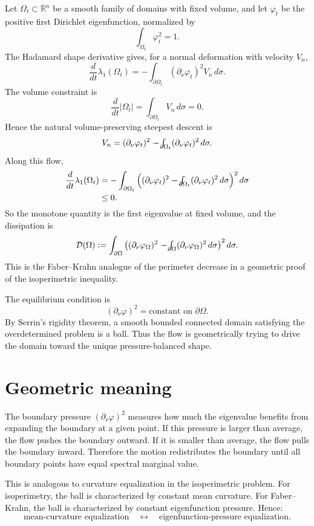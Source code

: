 \documentclass[11pt]{article}
\newcommand{\Om}{\Omega}
\newcommand{\R}{\mathbb{R}}
\newcommand{\D}{\mathcal D}
\newcommand{\fint}{\mathop{\mathchoice{\vcenter{\hbox{\Large$\int$}}\kern-1.4em\vcenter{\hbox{\scriptsize$-$}}}{\vcenter{\hbox{\large$\int$}}\kern-1.1em\vcenter{\hbox{\scriptsize$-$}}}{\vcenter{\hbox{$\int$}}\kern-.85em\vcenter{\hbox{\scriptsize$-$}}}{\vcenter{\hbox{$\int$}}\kern-.7em\vcenter{\hbox{\tiny$-$}}}}\nolimits}
\begin{document}
Let $\Om_t \subset \R^n$ be a smooth family of domains with fixed volume, and let $\varphi_t$ be the positive first Dirichlet eigenfunction, normalized by
\[
    \int_{\Om_t} \varphi_t^2 = 1.
\]
The Hadamard shape derivative gives, for a normal deformation with velocity $V_n$,
\[
    \frac{d}{dt}\lambda_1(\Om_t)
    = - \int_{\partial \Om_t} (\partial_\nu \varphi_t)^2 V_n \, d\sigma.
\]
The volume constraint is
\[
    \frac{d}{dt}|\Om_t| = \int_{\partial \Om_t} V_n \, d\sigma = 0.
\]
Hence the natural volume-preserving steepest descent is
\[
    V_n
    = (\partial_\nu \varphi_t)^2
    - \fint_{\partial \Om_t} (\partial_\nu \varphi_t)^2 \, d\sigma .
\]
Along this flow,
\[
\begin{aligned}
    \frac{d}{dt}\lambda_1(\Om_t)
    &= -\int_{\partial \Om_t}
    \left((\partial_\nu \varphi_t)^2
    - \fint_{\partial \Om_t}(\partial_\nu \varphi_t)^2\,d\sigma\right)^2 d\sigma \\
    &\leq 0.
\end{aligned}
\]
So the monotone quantity is the first eigenvalue at fixed volume, and the dissipation is
\[
    \D(\Om)
    :=
    \int_{\partial \Om}
    \left((\partial_\nu \varphi_\Om)^2
    - \fint_{\partial \Om}(\partial_\nu \varphi_\Om)^2\,d\sigma\right)^2 d\sigma .
\]
This is the Faber--Krahn analogue of the perimeter decrease in a geometric proof of the isoperimetric inequality.

The equilibrium condition is
\[
    (\partial_\nu \varphi)^2 = \text{constant on } \partial \Om.
\]
By Serrin's rigidity theorem, a smooth bounded connected domain satisfying the overdetermined problem is a ball. Thus the flow is geometrically trying to drive the domain toward the unique pressure-balanced shape.

\section{Geometric meaning}

The boundary pressure $(\partial_\nu\varphi)^2$ measures how much the eigenvalue benefits from expanding the boundary at a given point. If this pressure is larger than average, the flow pushes the boundary outward. If it is smaller than average, the flow pulls the boundary inward. Therefore the motion redistributes the boundary until all boundary points have equal spectral marginal value.

This is analogous to curvature equalization in the isoperimetric problem. For isoperimetry, the ball is characterized by constant mean curvature. For Faber--Krahn, the ball is characterized by constant eigenfunction pressure. Hence:
\[
    \text{mean-curvature equalization}
    \quad \leftrightarrow \quad
    \text{eigenfunction-pressure equalization}.
\]
\end{document}

